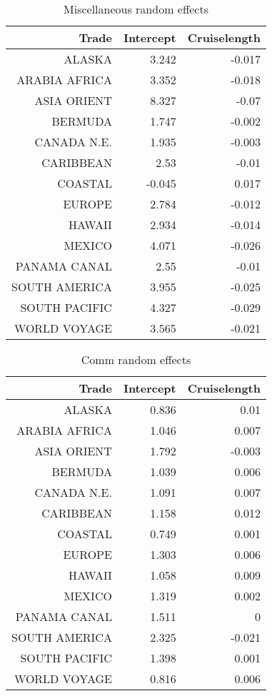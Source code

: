 \documentclass{article}
\begin{document}
	\begin{table}[H]
		\centering 
		\begin{tabular}{rrr}
			Trade & Intercept & Cruiselength \\
			\hline 
			\hline 
			ALASKA & 3.242 & -0.017 \\
			ARABIA AFRICA & 3.352 & -0.018 \\
			ASIA ORIENT & 8.327 & -0.07 \\
			BERMUDA & 1.747 & -0.002 \\
			CANADA N.E. & 1.935 & -0.003 \\
			CARIBBEAN & 2.53 & -0.01 \\
			COASTAL & -0.045 & 0.017 \\
			EUROPE & 2.784 & -0.012 \\
			HAWAII & 2.934 & -0.014 \\
			MEXICO & 4.071 & -0.026 \\
			PANAMA CANAL & 2.55 & -0.01 \\
			SOUTH AMERICA & 3.955 & -0.025 \\
			SOUTH PACIFIC & 4.327 & -0.029 \\
			WORLD VOYAGE & 3.565 & -0.021 \\
			\hline 
			\hline 
		\end{tabular}
		\caption{Miscellaneous random effects}
	\end{table}
	
	\begin{table}[H]\centering 
		\begin{tabular}{rrr}
			Trade & Intercept & Cruiselength \\ 
			\hline 
			\hline 
			ALASKA & 0.836 & 0.01 \\
			ARABIA AFRICA & 1.046 & 0.007 \\
			ASIA ORIENT & 1.792 & -0.003 \\
			BERMUDA & 1.039 & 0.006 \\
			CANADA N.E. & 1.091 & 0.007 \\
			CARIBBEAN & 1.158 & 0.012 \\
			COASTAL & 0.749 & 0.001 \\
			EUROPE & 1.303 & 0.006 \\
			HAWAII & 1.058 & 0.009 \\
			MEXICO & 1.319 & 0.002 \\
			PANAMA CANAL & 1.511 & 0 \\
			SOUTH AMERICA & 2.325 & -0.021 \\
			SOUTH PACIFIC & 1.398 & 0.001 \\
			WORLD VOYAGE & 0.816 & 0.006 \\
			\hline 
			\hline 
		\end{tabular}
		\caption{Comm random effects}
	\end{table}
\end{document}
